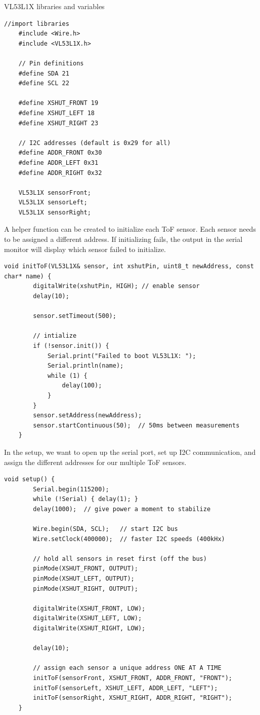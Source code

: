 \documentclass[11pt]{report}
\begin{document}
	\newpage
	\noindent
	VL53L1X libraries and variables
	\begin{lstlisting}[style=arduino]
	//import libraries
	#include <Wire.h> 
	#include <VL53L1X.h> 

	// Pin definitions
	#define SDA 21
	#define SCL 22

	#define XSHUT_FRONT 19
	#define XSHUT_LEFT 18
	#define XSHUT_RIGHT 23

	// I2C addresses (default is 0x29 for all)
	#define ADDR_FRONT 0x30
	#define ADDR_LEFT 0x31
	#define ADDR_RIGHT 0x32

	VL53L1X sensorFront;
	VL53L1X sensorLeft;
	VL53L1X sensorRight;
	\end{lstlisting}

	\noindent
	A helper function can be created to initialize each ToF sensor. Each sensor needs to be assigned a different 
	address. If initializing fails, the output in the serial monitor will display which sensor failed to initialize.
	\newline

	\begin{lstlisting}[style=arduino]
	void initToF(VL53L1X& sensor, int xshutPin, uint8_t newAddress, const char* name) {
		digitalWrite(xshutPin, HIGH); // enable sensor
		delay(10);

		sensor.setTimeout(500);

		// intialize
		if (!sensor.init()) {
			Serial.print("Failed to boot VL53L1X: ");
			Serial.println(name);
			while (1) {
				delay(100);
			}
		}
		sensor.setAddress(newAddress);
		sensor.startContinuous(50);  // 50ms between measurements
	}
	\end{lstlisting}
	
	\newpage
	\noindent
	In the setup, we want to open up the serial port, set up I2C communication, and assign the different addresses for 
	our multiple ToF sensors. 
	\newline

	\begin{lstlisting}[style=arduino]
	void setup() {
		Serial.begin(115200); 
		while (!Serial) { delay(1); }
		delay(1000);  // give power a moment to stabilize

		Wire.begin(SDA, SCL);   // start I2C bus
		Wire.setClock(400000);  // faster I2C speeds (400kHx)

		// hold all sensors in reset first (off the bus)
		pinMode(XSHUT_FRONT, OUTPUT);
		pinMode(XSHUT_LEFT, OUTPUT);
		pinMode(XSHUT_RIGHT, OUTPUT);

		digitalWrite(XSHUT_FRONT, LOW);
		digitalWrite(XSHUT_LEFT, LOW);
		digitalWrite(XSHUT_RIGHT, LOW);

		delay(10);

		// assign each sensor a unique address ONE AT A TIME
		initToF(sensorFront, XSHUT_FRONT, ADDR_FRONT, "FRONT");
		initToF(sensorLeft, XSHUT_LEFT, ADDR_LEFT, "LEFT");
		initToF(sensorRight, XSHUT_RIGHT, ADDR_RIGHT, "RIGHT");
	}
	\end{lstlisting}
\end{document}
